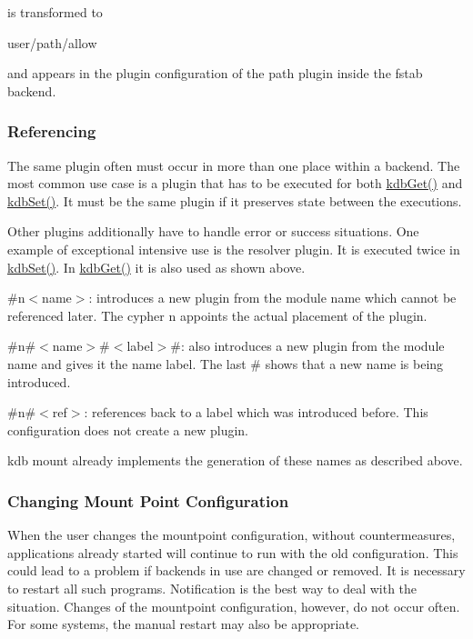is transformed to \begin{DoxyVerb}    user/path/allow
\end{DoxyVerb}


and appears in the plugin configuration of the path plugin inside the fstab backend.

\subsubsection*{Referencing}

The same plugin often must occur in more than one place within a backend. The most common use case is a plugin that has to be executed for both {\ttfamily \hyperlink{group__kdb_ga28e385fd9cb7ccfe0b2f1ed2f62453a1}{kdb\+Get()}} and {\ttfamily \hyperlink{group__kdb_ga11436b058408f83d303ca5e996832bcf}{kdb\+Set()}}. It must be the same plugin if it preserves state between the executions.

Other plugins additionally have to handle error or success situations. One example of exceptional intensive use is the resolver plugin. It is executed twice in {\ttfamily \hyperlink{group__kdb_ga11436b058408f83d303ca5e996832bcf}{kdb\+Set()}}. In {\ttfamily \hyperlink{group__kdb_ga28e385fd9cb7ccfe0b2f1ed2f62453a1}{kdb\+Get()}} it is also used as shown above.


\begin{DoxyItemize}
\item {\ttfamily \#n$<$name$>$}\+: introduces a new plugin from the module {\ttfamily name} which cannot be referenced later. The cypher {\ttfamily n} appoints the actual placement of the plugin.
\item {\ttfamily \#n\#$<$name$>$\#$<$label$>$\#}\+: also introduces a new plugin from the module {\ttfamily name} and gives it the name {\ttfamily label}. The last {\ttfamily \#} shows that a new name is being introduced.
\item {\ttfamily \#n\#$<$ref$>$}\+: references back to a label which was introduced before. This configuration does not create a new plugin.
\end{DoxyItemize}

{\ttfamily kdb mount} already implements the generation of these names as described above.

\subsubsection*{Changing Mount Point Configuration}

When the user changes the mountpoint configuration, without countermeasures, applications already started will continue to run with the old configuration. This could lead to a problem if backends in use are changed or removed. It is necessary to restart all such programs. Notification is the best way to deal with the situation. Changes of the mountpoint configuration, however, do not occur often. For some systems, the manual restart may also be appropriate.

